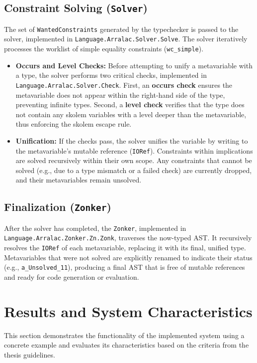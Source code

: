 \subsection{Constraint Solving (\texttt{Solver})}
The set of \texttt{WantedConstraints} generated by the typechecker is passed to the solver, implemented in \texttt{Language.Arralac.Solver.Solve}. The solver iteratively processes the worklist of simple equality constraints (\texttt{wc\_simple}).
\begin{itemize}
    \item \textbf{Occurs and Level Checks:} Before attempting to unify a metavariable with a type, the solver performs two critical checks, implemented in \texttt{Language.Arralac.Solver.Check}. First, an \textbf{occurs check} ensures the metavariable does not appear within the right-hand side of the type, preventing infinite types. Second, a \textbf{level check} verifies that the type does not contain any skolem variables with a level deeper than the metavariable, thus enforcing the skolem escape rule.
    \item \textbf{Unification:} If the checks pass, the solver unifies the variable by writing to the metavariable's mutable reference (\texttt{IORef}). Constraints within implications are solved recursively within their own scope. Any constraints that cannot be solved (e.g., due to a type mismatch or a failed check) are currently dropped, and their metavariables remain unsolved.
\end{itemize}

\subsection{Finalization (\texttt{Zonker})}
After the solver has completed, the \texttt{Zonker}, implemented in \texttt{Language.Arralac.Zonker.Zn.Zonk}, traverses the now-typed AST. It recursively resolves the \texttt{IORef} of each metavariable, replacing it with its final, unified type. Metavariables that were not solved are explicitly renamed to indicate their status (e.g., \texttt{a_Unsolved_11}), producing a final AST that is free of mutable references and ready for code generation or evaluation.

\section{Results and System Characteristics}
\label{sec:Implementation:Results}

This section demonstrates the functionality of the implemented system using a concrete example and evaluates its characteristics based on the criteria from the thesis guidelines.

